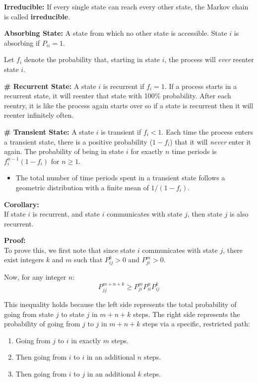 \documentclass[12pt,a4paper]{article}
\begin{document}
\textbf{Irreducible:} If every single state can reach every other state, the Markov chain is called \textbf{irreducible}.

\textbf{Absorbing State:} A state from which no other state is accessible. State $i$ is absorbing if $P_{ii} = 1$.

\vspace{2cm}

Let $f_i$ denote the probability that, starting in state $i$, the process will \textit{ever} reenter state $i$.

\textbf{\textcolor{primary}{\# Recurrent State:}} A state $i$ is recurrent if $f_i = 1$. If a process starts in a recurrent state, it will reenter that state with 100\% probability. After each reentry, it is like the process again starts over so if a state is recurrent then it will reenter infinitely often.

\textbf{\textcolor{primary}{\# Transient State:}} A state $i$ is transient if $f_i < 1$. Each time the process enters a transient state, there is a positive probability ($1 - f_i$) that it will \textit{never} enter it again. The probability of being in state $i$ for exactly $n$ time periods is $f_i^{n-1}(1 - f_i)$ for $n \ge 1$.
\begin{itemize}
    \item The total number of time periods spent in a transient state follows a geometric distribution with a finite mean of $1/(1 - f_i)$.
\end{itemize}

\vspace{0.3cm}
\textbf{Corollary:} \\
If state $i$ is recurrent, and state $i$ communicates with state $j$, then state $j$ is also recurrent.

\textbf{Proof:} \\
To prove this, we first note that since state $i$ communicates with state $j$, there exist integers $k$ and $m$ such that $P_{ij}^k > 0$ and $P_{ji}^m > 0$.

Now, for any integer $n$:
\[ P_{jj}^{m+n+k} \ge P_{ji}^m P_{ii}^n P_{ij}^k \]

This inequality holds because the left side represents the total probability of going from state $j$ to state $j$ in $m + n + k$ steps. The right side represents the probability of going from $j$ to $j$ in $m + n + k$ steps via a specific, restricted path:
\begin{enumerate}
    \item Going from $j$ to $i$ in exactly $m$ steps.
    \item Then going from $i$ to $i$ in an additional $n$ steps.
    \item Then going from $i$ to $j$ in an additional $k$ steps.
\end{enumerate}
\end{document}
